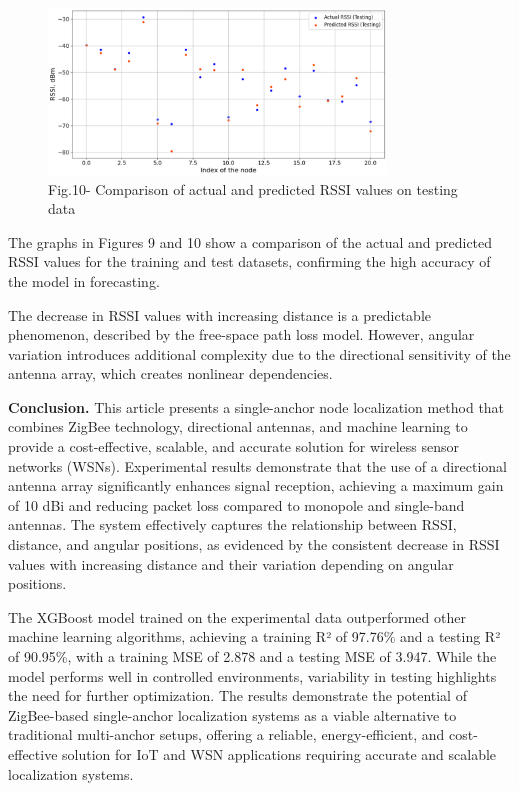 \begin{figure}[H]
	\centering
	\includegraphics[width=0.8\textwidth]{media/ict/image50}
	\caption*{Fig.10- Comparison of actual and predicted RSSI values on testing data}
\end{figure}

\begin{multicols}{2}
The graphs in Figures 9 and 10 show a comparison of the actual and
predicted RSSI values \hspace{0pt}\hspace{0pt}for the training and test
datasets, confirming the high accuracy of the model in forecasting.

The decrease in RSSI values with increasing distance is a predictable
phenomenon, described by the free-space path loss model. However,
angular variation introduces additional complexity due to the
directional sensitivity of the antenna array, which creates nonlinear
dependencies.

{\bfseries Conclusion.} This article presents a single-anchor node
localization method that combines ZigBee technology, directional
antennas, and machine learning to provide a cost-effective, scalable,
and accurate solution for wireless sensor networks (WSNs). Experimental
results demonstrate that the use of a directional antenna array
significantly enhances signal reception, achieving a maximum gain of 10
dBi and reducing packet loss compared to monopole and single-band
antennas. The system effectively captures the relationship between RSSI,
distance, and angular positions, as evidenced by the consistent decrease
in RSSI values with increasing distance and their variation depending on
angular positions.

The XGBoost model trained on the experimental data outperformed other
machine learning algorithms, achieving a training R² of 97.76\% and a
testing R² of 90.95\%, with a training MSE of 2.878 and a testing MSE of
3.947. While the model performs well in controlled environments,
variability in testing highlights the need for further optimization. The
results demonstrate the potential of ZigBee-based single-anchor
localization systems as a viable alternative to traditional multi-anchor
setups, offering a reliable, energy-efficient, and cost-effective
solution for IoT and WSN applications requiring accurate and scalable
localization systems.


\end{multicols}
